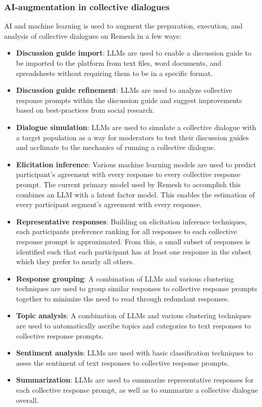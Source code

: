 \documentclass{article}
\begin{document}
\subsubsection{AI-augmentation in collective dialogues}
AI and machine learning is used to augment the preparation, execution, and analysis of collective dialogues on Remesh in a few ways:
\begin{itemize}
    \item \textbf{Discussion guide import}: LLMs are used to enable a discussion guide to be imported to the platform from text files, word documents, and spreadsheets without requiring them to be in a specific format. 
    \item \textbf{Discussion guide refinement}: LLMs are used to analyze collective response prompts within the discussion guide and suggest improvements based on best-practices from social research. 
    \item \textbf{Dialogue simulation}: LLMs are used to simulate a collective dialogue with a target population as a way for moderators to test their discussion guides and acclimate to the mechanics of running a collective dialogue.
    \item \textbf{Elicitation inference}: Various machine learning models are used to predict participant's agreement with every response to every collective response prompt. The current primary model used by Remesh to accomplish this combines an LLM with a latent factor model. This enables the estimation of every participant segment's agreement with every response.
    \item \textbf{Representative responses}: Building on elicitation inference techniques, each participants preference ranking for all responses to each collective response prompt is approximated. From this, a small subset of responses is identified such that each participant has at least one response in the subset which they prefer to nearly all others. 
    \item \textbf{Response grouping}: A combination of LLMs and various clustering techniques are used to group similar responses to collective response prompts together to minimize the need to read through redundant responses. 
    \item \textbf{Topic analysis}: A combination of LLMs and various clustering techniques are used to automatically ascribe topics and categories to text responses to collective response prompts.
    \item \textbf{Sentiment analysis}: LLMs are used with basic classification techniques to asses the sentiment of text responses to collective response prompts. 
    \item \textbf{Summarization}: LLMs are used to summarize representative responses for each collective response prompt, as well as to summarize a collective dialogue overall.
\end{itemize}
\end{document}
